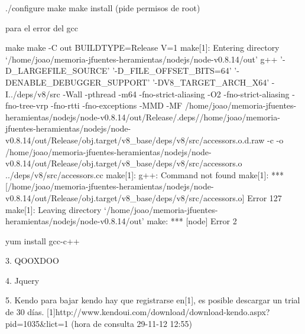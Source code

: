         ./configure
     	make
  	make install (pide permisos de root)

	para el error del gcc 
	
make
make -C out BUILDTYPE=Release V=1
make[1]: Entering directory `/home/joao/memoria-jfuentes-heramientas/nodejs/node-v0.8.14/out'
  g++ '-D_LARGEFILE_SOURCE' '-D_FILE_OFFSET_BITS=64' '-DENABLE_DEBUGGER_SUPPORT' '-DV8_TARGET_ARCH_X64' -I../deps/v8/src  -Wall -pthread -m64 -fno-strict-aliasing -O2 -fno-strict-aliasing -fno-tree-vrp -fno-rtti -fno-exceptions -MMD -MF /home/joao/memoria-jfuentes-heramientas/nodejs/node-v0.8.14/out/Release/.deps//home/joao/memoria-jfuentes-heramientas/nodejs/node-v0.8.14/out/Release/obj.target/v8_base/deps/v8/src/accessors.o.d.raw  -c -o /home/joao/memoria-jfuentes-heramientas/nodejs/node-v0.8.14/out/Release/obj.target/v8_base/deps/v8/src/accessors.o ../deps/v8/src/accessors.cc
make[1]: g++: Command not found
make[1]: *** [/home/joao/memoria-jfuentes-heramientas/nodejs/node-v0.8.14/out/Release/obj.target/v8_base/deps/v8/src/accessors.o] Error 127
make[1]: Leaving directory `/home/joao/memoria-jfuentes-heramientas/nodejs/node-v0.8.14/out'
make: *** [node] Error 2

	yum install gcc-c++




3. QOOXDOO




4. Jquery



5. Kendo
para bajar kendo hay que registrarse en[1], es posible descargar un trial de 30 días.
[1]http://www.kendoui.com/download/download-kendo.aspx?pid=1035&lict=1 (hora de consulta 29-11-12 12:55)



